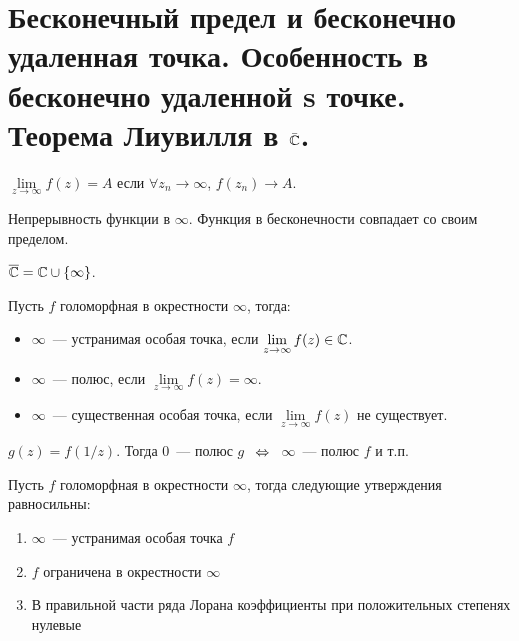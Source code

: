 \section{Бесконечный предел и бесконечно удаленная точка. Особенность в бесконечно удаленной s точке. Теорема Лиувилля в $\bar{\mathbb{C}}$.}

\begin{definition}
    $\lim\limits_{z\to\infty} f(z) = A$
    если $\forall z_n \to \infty$, $f(z_n) \to A$.
\end{definition}

\begin{definition}
    Непрерывность функции в $\infty$.
    Функция в бесконечности совпадает со своим пределом.
\end{definition}

\begin{notation}
    $\overline{\mathbb{C}} = \mathbb{C} \cup \left\{\infty\right\}$.
\end{notation}

\begin{definition}
    Пусть $f$ голоморфная в окрестности $\infty$, тогда: 
    \begin{itemize}
        \item $\infty$~--- устранимая особая точка, если
        $\lim\limits_{z\to\infty} f(z) \in \mathbb{C}$.
        \item $\infty$~--- полюс, если
        $\lim\limits_{z\to\infty} f(z) = \infty$.
        \item $\infty$~--- существенная особая точка, если
        $\lim\limits_{z\to\infty} f(z)$ не существует.
    \end{itemize}
\end{definition}

\begin{observation}
    $g(z) = f(1/z)$. Тогда $0$~--- полюс $g$
    $\; \, \Leftrightarrow \; \,$ $\infty$~--- полюс $f$ и т.п.
\end{observation}

\begin{observation}
    Пусть $f$ голоморфная в окрестности $\infty$, тогда
    следующие утверждения равносильны:

    \begin{enumerate}
        \item $\infty$~--- устранимая особая точка $f$
        \item $f$ ограничена в окрестности $\infty$
        \item В правильной части ряда Лорана
              коэффициенты при положительных степенях нулевые
    \end{enumerate}
\end{observation}

